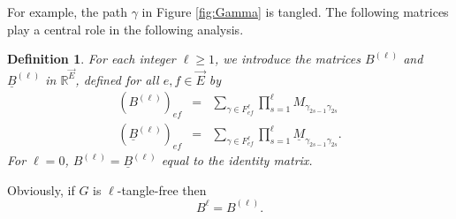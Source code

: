 \documentclass[11pt]{article}
\newtheorem{definition}[lemma]{Definition}
\newcommand{\dR}{\mathbb {R}}
\newcommand{\1}{1\!\!{\sf I}}\newcommand{\IND}{\1}
\begin{document}
For example, the path $\gamma$ in Figure \ref{fig:Gamma} is tangled. The following matrices  play a central role in the following analysis. 

\begin{definition}
For each integer $\ell \geq 1$, we introduce the matrices $B^{(\ell)} $ and $\underline B^{(\ell)}$ in $\dR^{\vec E}$, defined for all $e,f \in \vec E$ by 
\begin{eqnarray}\label{eq:defD1}
(B^{(\ell)} ) _{ef} &= &\sum_{\gamma \in F^{\ell} _{e f}} \prod_{s=1}^{\ell} M_{\gamma_{2s-1} \gamma_{2s}}\\
\label{eq:defD}
( \underline B^{(\ell)}) _{ef} &=& \sum_{\gamma \in F^{\ell} _{e f}}   \prod_{s=1}^{\ell} \underline M_{\gamma_{2s-1} \gamma_{2s}}.
\end{eqnarray}
For $\ell = 0$, $B^{(\ell)}= \underline B^{(\ell)}$ equal to the identity matrix. 
\end{definition}

Obviously, if $G$ is $\ell$-tangle-free then
\begin{equation}\label{eq:BkBk}
B^{\ell}   = B^{(\ell)}.
\end{equation}
\end{document}
